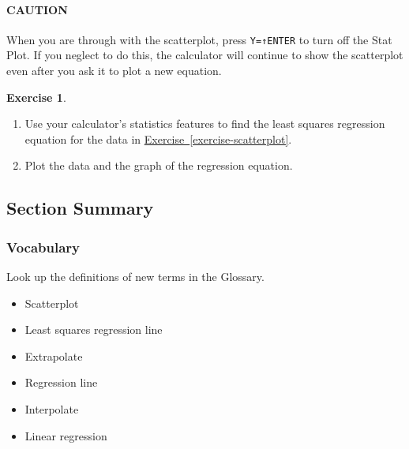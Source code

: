 \documentclass[10pt,]{book}
\theoremstyle{plain}
\theoremstyle{definition}
\theoremstyle{definition}
\theoremstyle{definition}
\theoremstyle{definition}
\newtheorem{exercise}[theorem]{Exercise}
\numberwithin{equation}{part}
\begin{document}
\paragraph[{CAUTION}]{CAUTION}\hypertarget{paragraphs-4}{}
When you are through with the scatterplot, press \lstinline?Y=?\lstinline?↑?\lstinline?ENTER? to turn off the Stat Plot. If you neglect to do this, the calculator will continue to show the scatterplot even after you ask it to plot a new equation.%
\begin{exercise}\label{exercise-GC-regression}
\leavevmode%
\begin{enumerate}[label=*\alph**]
\item\hypertarget{li-1334}{}Use your calculator’s statistics features to find the least squares regression equation for the data in \hyperref[exercise-scatterplot]{Exercise~\ref{exercise-scatterplot}}.%
\item\hypertarget{li-1335}{}Plot the data and the graph of the regression equation.%
\end{enumerate}
%
\end{exercise}
\typeout{************************************************}
\typeout{************************************************}
\subsection[{Section Summary}]{Section Summary}\label{summary-1-6}
\typeout{************************************************}
\typeout{************************************************}
\subsubsection[{Vocabulary}]{Vocabulary}\label{subsubsection-21}
Look up the definitions of new terms in the Glossary. \leavevmode%
\begin{multicols}{3}
\begin{itemize}[label=\textbullet]
\item{}Scatterplot%
\item{}Least squares regression line%
\item{}Extrapolate%
\item{}Regression line%
\item{}Interpolate%
\item{}Linear regression%
\end{itemize}
\end{multicols}
%
\typeout{************************************************}
\typeout{************************************************}
\end{document}
